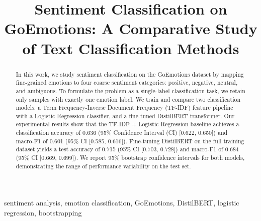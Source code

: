 \documentclass[
  conference,
  letterpaper]{IEEEtran}
\author{}
\date{}
\begin{document}
\title{Sentiment Classification on GoEmotions: A Comparative Study of Text Classification Methods}
\author{
  \and
  \and
}
\maketitle

\begin{abstract}
In this work, we study sentiment classification on the GoEmotions dataset by mapping fine-grained emotions to four coarse sentiment categories: positive, negative, neutral, and ambiguous. To formulate the problem as a single-label classification task, we retain only samples with exactly one emotion label. We train and compare two classification models: a Term Frequency-Inverse Document Frequency (TF-IDF) feature pipeline with a Logistic Regression classifier, and a fine-tuned DistilBERT transformer. Our experimental results show that the TF-IDF + Logistic Regression baseline achieves a classification accuracy of 0.636 (95\% Confidence Interval (CI) [0.622, 0.650]) and macro-F1 of 0.601 (95\% CI [0.585, 0.616]). Fine-tuning DistilBERT on the full training dataset yields a test accuracy of 0.715 (95\% CI [0.703, 0.728]) and macro-F1 of 0.684 (95\% CI [0.669, 0.699]). We report 95\% bootstrap confidence intervals for both models, demonstrating the range of performance variability on the test set.
\end{abstract}

\begin{IEEEkeywords}
sentiment analysis, emotion classification, GoEmotions, DistilBERT, logistic regression, bootstrapping
\end{IEEEkeywords}
\end{document}
